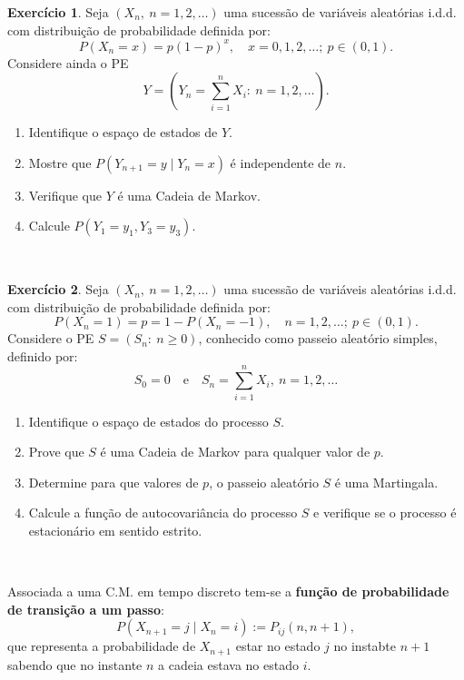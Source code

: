 \documentclass[
  11pt,
  a4paper,
]{book}
\theoremstyle{definition}
\theoremstyle{definition}
\theoremstyle{definition}
\newtheorem{exercise}{Exercício}[chapter]
\theoremstyle{definition}
\theoremstyle{remark}
\begin{document}
\begin{exercise}

Seja \((X_n, ~n=1,2,\dots)\) uma sucessão de variáveis aleatórias i.d.d. com distribuição de probabilidade definida por:
\[P(X_n=x)=p(1-p)^x, \quad x=0,1,2,\dots; ~ p \in (0,1).\]
Considere ainda o PE
\[Y=(Y_n=\sum\limits_{i=1}^{n}X_i: ~n=1,2,\dots).\]

\begin{enumerate}
\def\labelenumi{(\alph{enumi})}
\item
  Identifique o espaço de estados de \(Y\).
\item
  Mostre que \(P(Y_{n+1}=y \mid Y_n=x)\) é independente de \(n\).
\item
  Verifique que \(Y\) é uma Cadeia de Markov.
\item
  Calcule \(P(Y_1=y_1, Y_3=y_3)\).
\end{enumerate}

\end{exercise}

\(\,\)

\begin{exercise}

Seja \((X_n, ~n=1,2,\dots)\) uma sucessão de variáveis aleatórias i.d.d. com distribuição de probabilidade definida por:
\[P(X_n=1)=p=1-P(X_n=-1), \quad n=1,2,\dots; ~p \in (0,1).\]
Considere o PE \(S=(S_n: ~n\geq 0)\), conhecido como passeio aleatório simples, definido por:
\[S_0=0 \quad \text{e} \quad S_n=\sum\limits_{i=1}^{n}X_i, ~n=1,2,\dots\]

\begin{enumerate}
\def\labelenumi{(\alph{enumi})}
\item
  Identifique o espaço de estados do processo \(S\).
\item
  Prove que \(S\) é uma Cadeia de Markov para qualquer valor de \(p\).
\item
  Determine para que valores de \(p\), o passeio aleatório \(S\) é uma Martingala.
\item
  Calcule a função de autocovariância do processo \(S\) e verifique se o processo é estacionário em sentido estrito.
\end{enumerate}

\end{exercise}

\(\,\)

Associada a uma C.M. em tempo discreto tem-se a \textbf{função de probabilidade de transição a um passo}:
\[P(X_{n+1}=j \mid X_n=i):=P_{ij}(n,n+1),\]
que representa a probabilidade de \(X_{n+1}\) estar no estado \(j\) no instabte \(n+1\) sabendo que no instante \(n\) a cadeia estava no estado \(i\).
\end{document}
